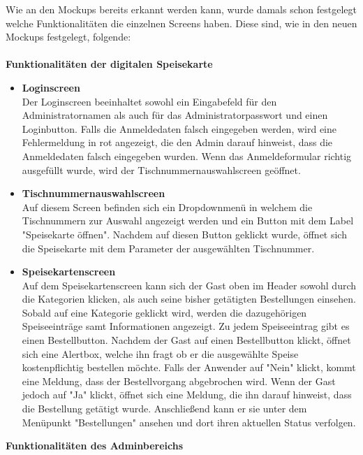 Wie an den Mockups bereits erkannt werden kann, wurde damals schon festgelegt welche Funktionalitäten die einzelnen Screens haben.
Diese sind, wie in den neuen Mockups festgelegt, folgende:\\ \\
\textbf{Funktionalitäten der digitalen Speisekarte}
\begin{itemize}
    \item \textbf{Loginscreen}\\
Der Loginscreen beeinhaltet sowohl ein Eingabefeld für den Administratornamen als auch für das Administratorpasswort und einen Loginbutton.
Falls die Anmeldedaten falsch eingegeben werden, wird eine Fehlermeldung in rot angezeigt, die den Admin darauf hinweist, dass die Anmeldedaten falsch eingegeben wurden.
Wenn das Anmeldeformular richtig ausgefüllt wurde, wird der Tischnummernauswahlscreen geöffnet.
    \item \textbf{Tischnummernauswahlscreen}\\
Auf diesem Screen befinden sich ein Dropdownmenü in welchem die Tischnummern zur Auswahl angezeigt werden und ein Button mit dem Label "Speisekarte öffnen". Nachdem auf diesen Button geklickt wurde, öffnet sich die Speisekarte mit dem Parameter der ausgewählten Tischnummer.
    \item \textbf{Speisekartenscreen}\\
Auf dem Speisekartenscreen kann sich der Gast oben im Header sowohl durch die Kategorien klicken, als auch seine bisher getätigten Bestellungen einsehen.
Sobald auf eine Kategorie geklickt wird, werden die dazugehörigen Speiseeinträge samt Informationen angezeigt. Zu jedem Speiseeintrag gibt es einen Bestellbutton.
Nachdem der Gast auf einen Bestellbutton klickt, öffnet sich eine Alertbox, welche ihn fragt ob er die ausgewählte Speise kostenpflichtig bestellen möchte. Falls der Anwender auf "Nein" klickt, kommt eine Meldung, dass der Bestellvorgang abgebrochen wird.
Wenn der Gast jedoch auf "Ja" klickt, öffnet sich eine Meldung, die ihn darauf hinweist, dass die Bestellung getätigt wurde. Anschließend kann er sie unter dem Menüpunkt "Bestellungen" ansehen und dort ihren aktuellen Status verfolgen.\\

  \end{itemize}
\textbf{Funktionalitäten des Adminbereichs}
